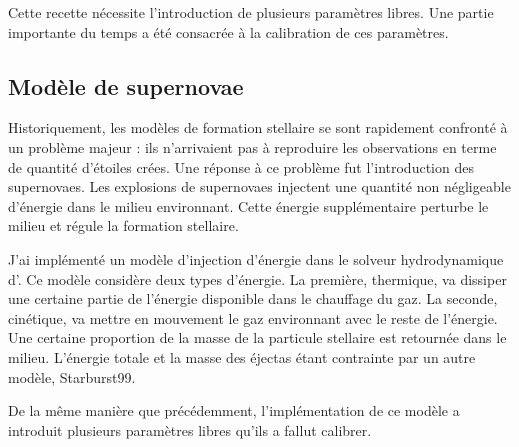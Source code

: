 Cette recette nécessite l'introduction de plusieurs paramètres libres.
Une partie importante du temps a été consacrée à la calibration de ces paramètres.

\subsection*{Mod\`ele de supernovae}

Historiquement, les modèles de formation stellaire se sont rapidement confronté à un problème majeur : ils n'arrivaient pas à reproduire les observations en terme de quantité d'étoiles crées.
Une réponse à ce problème fut l'introduction des supernovaes. 
Les explosions de supernovaes injectent une quantité non négligeable d'énergie dans le milieu environnant.
Cette énergie supplémentaire perturbe le milieu et régule la formation stellaire.

J'ai implémenté un modèle d'injection d'énergie dans le solveur hydrodynamique d'\emma.
Ce modèle considère deux types d'énergie. 
La première, thermique, va dissiper une certaine partie de l'énergie disponible dans le chauffage du gaz.
La seconde, cinétique, va mettre en mouvement le gaz environnant avec le reste de l'énergie.
Une certaine proportion de la masse de la particule stellaire est retournée dans le milieu. 
L'énergie totale et la masse des éjectas étant contrainte par un autre modèle, Starburst99.

De la même manière que précédemment, l'implémentation de ce modèle a introduit plusieurs paramètres libres qu'ils a fallut calibrer.




